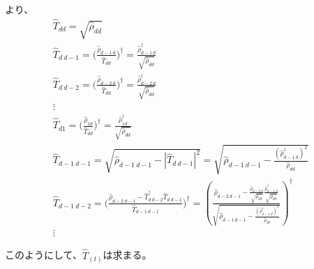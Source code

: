 \documentclass[11pt,a4j,notitlepage]{jreport}
\begin{document}
	より、
	\begin{equation*}
		\begin{gathered}
			\hat{T}_{dd} = \sqrt{\hat{\rho}_{dd}} \\
			\hat{T}_{d\ d-1} = \Big( \frac{\hat{\rho}_{d-1\ d}}{\hat{T}_{dd}} \Big)^\dagger = \frac{\hat{\rho}_{d-1\ d}^\dagger}{\sqrt{\hat{\rho}_{dd}}} \\
			\hat{T}_{d\ d-2} = \Big( \frac{\hat{\rho}_{d-2\ d}}{\hat{T}_{dd}} \Big)^\dagger = \frac{\hat{\rho}_{d-2\ d}^\dagger}{\sqrt{\hat{\rho}_{dd}}} \\
			\vdots \\
			\hat{T}_{d1} = \Big( \frac{\hat{\rho}_{1d}}{\hat{T}_{dd}} \Big)^\dagger = \frac{\hat{\rho}_{1d}^\dagger}{\sqrt{\hat{\rho}_{dd}}} \\
			\hat{T}_{d-1\ d-1} = \sqrt{\hat{\rho}_{d-1\ d-1} - | \hat{T}_{d\ d-1} |^2} = \sqrt{\hat{\rho}_{d-1\ d-1} - \frac{(\hat{\rho}_{d-1\ d}^\dagger)^2}{\hat{\rho}_{dd}}} \\
			\hat{T}_{d-1\ d-2} = \Bigg(\frac{\hat{\rho}_{d-2\ d-1} - \hat{T}_{d\ d-2}^\dagger \hat{T}_{d\ d-1}}{\hat{T}_{d-1\ d-1}} \Bigg)^\dagger = \left( \frac{\hat{\rho}_{d-2\ d-1} - \frac{\hat{\rho}_{d-2\ d}}{\sqrt{\hat{\rho}_{dd}}} \frac{\hat{\rho}_{d-1\ d}^\dagger}{\sqrt{\hat{\rho}_{dd}}}}{\sqrt{\hat{\rho}_{d-1\ d-1} - \frac{(\hat{\rho}_{d-1\ d}^\dagger)^2 }{\hat{\rho}_{dd}}}} \right)^\dagger \\
			\vdots
		\end{gathered}
	\end{equation*}

	このようにして、$\hat{T}_{(t)}$は求まる。
	
		
\end{document}
